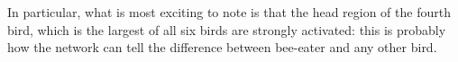 In particular, what is most exciting to note is that the head region of the fourth bird, which is the largest of all six birds are strongly activated: this is probably how the network can tell the difference between bee-eater and any other bird.

